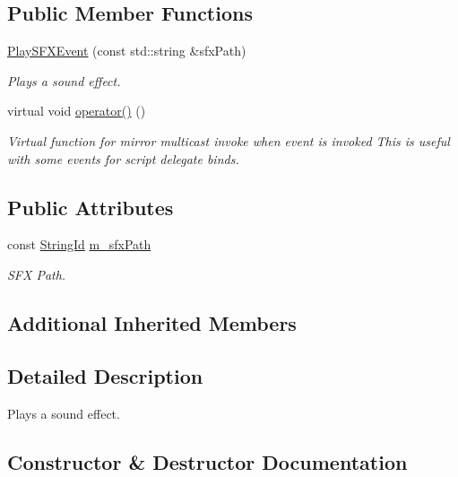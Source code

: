 \subsection*{Public Member Functions}
\begin{DoxyCompactItemize}
\item 
\hyperlink{classPlaySFXEvent_aa174fa3288c18a9ee6572a3b6997d69a}{Play\+S\+F\+X\+Event} (const std\+::string \&sfx\+Path)
\begin{DoxyCompactList}\small\item\em Plays a sound effect. \end{DoxyCompactList}\item 
\mbox{\label{classPlaySFXEvent_a9e823555f6bda26fb70312fee14be2f4}} 
virtual void \hyperlink{classPlaySFXEvent_a9e823555f6bda26fb70312fee14be2f4}{operator()} ()
\begin{DoxyCompactList}\small\item\em Virtual function for mirror multicast invoke when event is invoked This is useful with some events for script delegate binds. \end{DoxyCompactList}\end{DoxyCompactItemize}
\subsection*{Public Attributes}
\begin{DoxyCompactItemize}
\item 
\mbox{\label{classPlaySFXEvent_a7ec35447401425edb0408fdc63f0133a}} 
const \hyperlink{classStringId}{String\+Id} \hyperlink{classPlaySFXEvent_a7ec35447401425edb0408fdc63f0133a}{m\+\_\+sfx\+Path}
\begin{DoxyCompactList}\small\item\em S\+FX Path. \end{DoxyCompactList}\end{DoxyCompactItemize}
\subsection*{Additional Inherited Members}


\subsection{Detailed Description}
Plays a sound effect. 

\subsection{Constructor \& Destructor Documentation}
\mbox{\label{classPlaySFXEvent_aa174fa3288c18a9ee6572a3b6997d69a}} 

